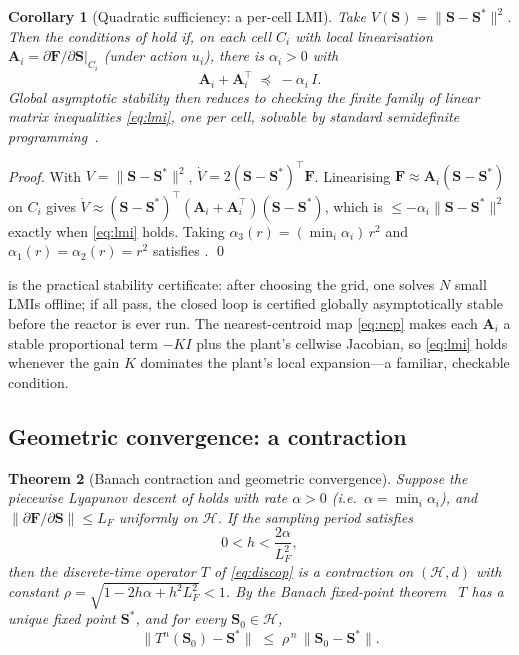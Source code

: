 \documentclass[11pt,a4paper,twocolumn]{article}
\theoremstyle{thmstyle}
\newtheorem{theorem}{Theorem}[section]
\newtheorem{corollary}[theorem]{Corollary}
\theoremstyle{definition}
\theoremstyle{remark}
\newcommand{\Hs}{\mathcal{H}}
\newcommand{\Ss}{\mathbf{S}}
\newcommand{\Sstar}{\Ss^{\ast}}
\newcommand{\norm}[1]{\lVert#1\rVert}
\begin{document}
\begin{corollary}[Quadratic sufficiency: a per-cell LMI]
\label{cor:lmi}
Take $V(\Ss)=\norm{\Ss-\Sstar}^2$. Then the conditions of
 hold if, on each cell $C_i$ with local linearisation
$\mathbf A_i=\partial\mathbf F/\partial\Ss\big|_{C_i}$ (under action
$u_i$), there is $\alpha_i>0$ with
\begin{equation}
\label{eq:lmi}
\mathbf A_i+\mathbf A_i^{\top}\;\preceq\;-\alpha_i\,I .
\end{equation}
Global asymptotic stability then reduces to checking the finite family of
linear matrix inequalities \eqref{eq:lmi}, one per cell, solvable by
standard semidefinite programming~\citep{johansson1998computation}.
\end{corollary}

\begin{proof}
With $V=\norm{\Ss-\Sstar}^2$, $\dot V=2(\Ss-\Sstar)^{\top}\mathbf F$.
Linearising $\mathbf F\approx\mathbf A_i(\Ss-\Sstar)$ on $C_i$ gives
$\dot V\approx(\Ss-\Sstar)^{\top}(\mathbf A_i+\mathbf A_i^{\top})(\Ss-\Sstar)$,
which is $\le-\alpha_i\norm{\Ss-\Sstar}^2$ exactly when \eqref{eq:lmi}
holds. Taking $\alpha_3(r)=(\min_i\alpha_i)\,r^2$ and
$\alpha_1(r)=\alpha_2(r)=r^2$ satisfies . \qed
\end{proof}

 is the practical stability certificate: after choosing the
grid, one solves $N$ small LMIs offline; if all pass, the closed loop is
certified globally asymptotically stable before the reactor is ever run.
The nearest-centroid map \eqref{eq:ncp} makes each $\mathbf A_i$ a stable
proportional term $-KI$ plus the plant's cellwise Jacobian, so
\eqref{eq:lmi} holds whenever the gain $K$ dominates the plant's local
expansion---a familiar, checkable condition.

\subsection{Geometric convergence: a contraction}

\begin{theorem}[Banach contraction and geometric convergence]
\label{thm:banach}
Suppose the piecewise Lyapunov descent of  holds with
rate $\alpha>0$ \textup{(}i.e.\ $\alpha=\min_i\alpha_i$\textup{)}, and
$\norm{\partial\mathbf F/\partial\Ss}\le L_F$ uniformly on $\Hs$. If the
sampling period satisfies
\begin{equation}
\label{eq:step}
0<h<\frac{2\alpha}{L_F^2},
\end{equation}
then the discrete-time operator $T$ of \eqref{eq:discop} is a contraction
on $(\Hs,d)$ with constant $\rho=\sqrt{1-2h\alpha+h^2L_F^2}<1$. By the
Banach fixed-point theorem~\citep{kreyszig1989functional} $T$ has a
unique fixed point $\Sstar$, and for every $\Ss_0\in\Hs$,
\begin{equation}
\label{eq:geom}
\norm{T^n(\Ss_0)-\Sstar}\;\le\;\rho^{\,n}\,\norm{\Ss_0-\Sstar}.
\end{equation}
\end{theorem}
\end{document}
